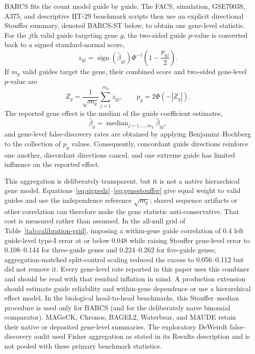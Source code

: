 BARCS fits the count model guide by guide.  The FACS, simulation, GSE70038,
A375, and descriptive HT-29 benchmark scripts then use an explicit
directional Stouffer summary, denoted BARCS-ST below, to obtain one gene-level
statistic.  For the $j$th valid guide targeting gene $g$, the two-sided guide
$p$-value is converted back to a signed standard-normal score,
\begin{equation}
  z_{gj}
  =
  \operatorname{sign}(\widehat{\beta}_{gj})
  \Phi^{-1}\!\left(1-\frac{p_{gj}}{2}\right).
  \label{eq:signedz}
\end{equation}
If $m_g$ valid guides target the gene, their combined score and two-sided
gene-level $p$-value are
\begin{equation}
  Z_g=\frac{1}{\sqrt{m_g}}\sum_{j=1}^{m_g}z_{gj},
  \qquad
  p_g=2\Phi(-|Z_g|).
  \label{eq:genestouffer}
\end{equation}
The reported gene effect is the median of the guide coefficient estimates,
\begin{equation}
  \widehat{\beta}_g
  =\operatorname{median}_{j=1,\ldots,m_g}
    \widehat{\beta}_{gj},
  \label{eq:geneeffect}
\end{equation}
and gene-level false-discovery rates are obtained by applying
Benjamini--Hochberg to the collection of $p_g$ values.  Consequently,
concordant guide directions reinforce one another, discordant directions
cancel, and one extreme guide has limited influence on the reported effect.

This aggregation is deliberately transparent, but it is not a native
hierarchical gene model.  Equations~\eqref{eq:signedz}--\eqref{eq:genestouffer}
give equal weight to valid guides and use the independence reference
$\sqrt{m_g}$; shared sequence artifacts or other correlation can therefore
make the gene statistic anti-conservative.  That cost is measured rather than
assumed.  In the all-null grid of Table~\ref{tab:calibration-grid}, imposing a
within-gene guide correlation of 0.4 left guide-level type-I error at or below
0.048 while raising Stouffer gene-level error to 0.108--0.144 for three-guide
genes and 0.224--0.262 for five-guide genes; aggregation-matched split-control
scaling reduced the excess to 0.056--0.112 but did not remove it.  Every
gene-level rate reported in this paper uses this combiner and should be read
with that residual inflation in mind.  A production extension should
estimate guide reliability and within-gene dependence or use a hierarchical
effect model.  In the biological head-to-head benchmarks, this
Stouffer--median procedure is used only for BARCS (and for the deliberately
naive binomial comparator).  MAGeCK, Chronos, BAGEL2, Waterbear, and MAUDE
retain their native or deposited gene-level summaries.  The exploratory
DeWeirdt false-discovery audit used Fisher aggregation as stated in its
Results description and is not pooled with these primary benchmark
statistics.
